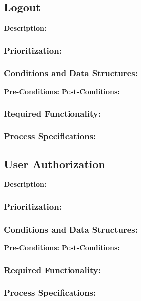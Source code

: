 \subsection{Logout}
\textbf{Description:}
\subsubsection{Prioritization:}
\subsubsection{Conditions and Data Structures:}
\textbf{Pre-Conditions:}
\textbf{Post-Conditions:}	
\subsubsection{Required Functionality:} 
\subsubsection{Process Specifications:}



\subsection{User Authorization}
\textbf{Description:}
\subsubsection{Prioritization:}
\subsubsection{Conditions and Data Structures:}
\textbf{Pre-Conditions:}
\textbf{Post-Conditions:}	
\subsubsection{Required Functionality:} 
\subsubsection{Process Specifications:}